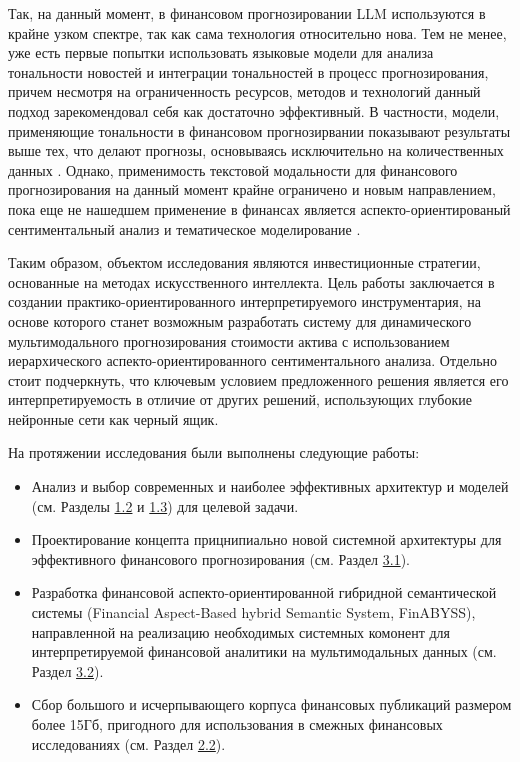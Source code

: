Так, на данный момент, в финансовом прогнозировании LLM используются в крайне узком спектре, так как сама технология относительно нова.
Тем не менее, уже есть первые попытки использовать языковые модели для анализа тональности новостей и интеграции тональностей в процесс
прогнозирования, причем несмотря на ограниченность ресурсов, методов и технологий данный подход зарекомендовал себя как достаточно
эффективный. В частности, модели, применяющие тональности в финансовом прогнозирвании показывают результаты выше тех, что делают
прогнозы, основываясь исключительно на количественных данных \parencite{Kim2023, Jiang2023, Halder2022}. Однако, применимость текстовой
модальности для финансового прогнозирования на данный момент крайне ограничено и новым направлением, пока еще не нашедшем применение
в финансах является аспекто-ориентированый сентиментальный анализ \parencite{SA2020taxonomy,FSA2020problems} и тематическое моделирование
\parencite{angelov2020top2vec,BERTopic2022}.

Таким образом, объектом исследования являются инвестиционные стратегии, основанные на методах искусственного интеллекта. Цель работы
заключается в создании практико-ориентированного интерпретируемого инструментария, на основе которого станет
возможным разработать систему для динамического мультимодального прогнозирования стоимости актива с использованием иерархического
аспекто-ориентированного сентиментального анализа. Отдельно стоит подчеркнуть, что ключевым условием предложенного решения является
его интерпретируемость в отличие от других решений, использующих глубокие нейронные сети как черный ящик.

На протяжении исследования были выполнены следующие работы:

\begin{itemize}
    \item Анализ и выбор современных и наиболее эффективных архитектур и моделей (см. Разделы \hyperref[sec:ml_algos]{1.2} и
    \hyperref[sec:models]{1.3}) для целевой задачи.
    \item Проектирование концепта прицнипиально новой системной архитектуры для эффективного финансового прогнозирования
    (см. Раздел \hyperref[sec:architecture]{3.1}).
    \item Разработка финансовой аспекто-ориентированной гибридной семантической системы (Financial Aspect-Based hybrid Semantic System, FinABYSS),
    направленной на реализацию необходимых системных комонент для интерпретируемой финансовой аналитики на мультимодальных данных
    (см. Раздел \hyperref[sec:components]{3.2}).
    \item Сбор большого и исчерпывающего корпуса финансовых публикаций размером более 15Гб, пригодного для использования в смежных финансовых исследованиях
    (см. Раздел \hyperref[sec:data_governance]{2.2}).
\end{itemize}

